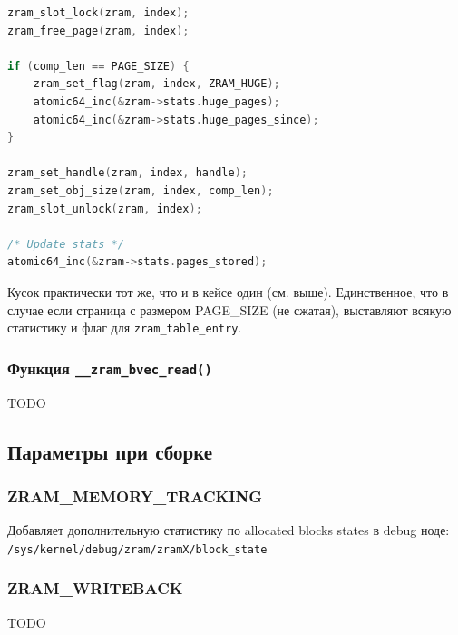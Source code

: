 \documentclass[12pt]{report}
\begin{document}
\begin{lstlisting}[language=c]
zram_slot_lock(zram, index);
zram_free_page(zram, index);

if (comp_len == PAGE_SIZE) {
	zram_set_flag(zram, index, ZRAM_HUGE);
	atomic64_inc(&zram->stats.huge_pages);
	atomic64_inc(&zram->stats.huge_pages_since);
}

zram_set_handle(zram, index, handle);
zram_set_obj_size(zram, index, comp_len);
zram_slot_unlock(zram, index);

/* Update stats */
atomic64_inc(&zram->stats.pages_stored);
\end{lstlisting}

Кусок практически тот же, что и в кейсе один (см. выше). Единственное, что в случае если страница с размером PAGE\_SIZE (не сжатая), выставляют всякую статистику и флаг для \texttt{zram\_table\_entry}.

\subsubsection{Функция \texttt{\_\_zram\_bvec\_read()}}

TODO

\subsection*{Параметры при сборке}

\subsubsection{ZRAM\_MEMORY\_TRACKING} 

Добавляет дополнительную статистику по allocated blocks states в debug ноде:\\ \texttt{/sys/kernel/debug/zram/zramX/block\_state}

\subsubsection{ZRAM\_WRITEBACK}

TODO
	



	
\end{document}
